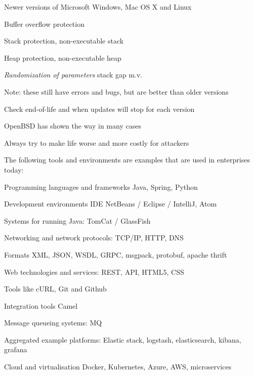 \documentclass[Screen16to9,17pt]{foils}
\begin{document}

\begin{list1}
\item Newer versions of Microsoft Windows, Mac OS X and Linux
\begin{list2}
\item Buffer overflow protection
\item Stack protection, non-executable stack
\item Heap protection, non-executable heap
\item \emph{Randomization of parameters} stack gap m.v.
\end{list2}
\item Note: these still have errors and bugs, but are better than older versions
\item Check end-of-life and when updates will stop for each version
\item OpenBSD has shown the way in many cases\\ 
\end{list1}

\vskip 1cm

\centerline{Always try to make life worse and more costly for attackers}






The following tools and environments are examples that are used in enterprises today:

\begin{list2}
\item Programming languages and frameworks Java, Spring, Python
\item Development environments IDE NetBeans / Eclipse / IntelliJ, Atom
\item Systems for running Java: TomCat / GlassFish
\item Networking and network protocols: TCP/IP, HTTP, DNS
\item Formats XML, JSON, WSDL, GRPC, msgpack, protobuf, apache thrift
\item Web technologies and services: REST, API, HTML5, CSS
\item Tools like cURL, Git and Github
\item Integration tools Camel
\item Message queueing systems: MQ
\item Aggregated example platforms: Elastic stack, logstash, elasticsearch, kibana, grafana
\item Cloud and virtualisation Docker, Kubernetes, Azure, AWS, microservices
\end{list2}
\end{document}
